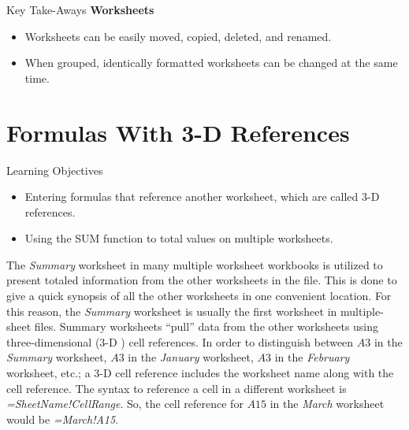 \begin{center}
	\begin{tkwbox}{Key Take-Aways}
		\textbf{Worksheets}
		\\
		\begin{itemize}
			\setlength{\itemsep}{0pt}
			\setlength{\parskip}{0pt}
			\setlength{\parsep}{0pt}
			
			\item Worksheets can be easily moved, copied, deleted, and renamed.
			\item When grouped, identically formatted worksheets can be changed at the same time.
			
		\end{itemize}
	\end{tkwbox}
\end{center}

\section{Formulas With 3-D References}

\begin{center}
	\begin{objbox}{Learning Objectives}
		\begin{itemize}
			\setlength{\itemsep}{0pt}
			\setlength{\parskip}{0pt}
			\setlength{\parsep}{0pt}

			\item Entering formulas that reference another worksheet, which are called $ 3 $-D references.
			\item Using the SUM function to total values on multiple worksheets.
			
		\end{itemize}
	\end{objbox}
\end{center}

The \textit{Summary} worksheet in many multiple worksheet workbooks is utilized to present totaled information from the other worksheets in the file. This is done to give a quick synopsis of all the other worksheets in one convenient location. For this reason, the \textit{Summary} worksheet is usually the first worksheet in multiple-sheet files. Summary worksheets ``pull'' data from the other worksheets using three-dimensional ($ 3 $-D ) cell references. In order to distinguish between $ A3 $ in the \textit{Summary} worksheet, $ A3 $ in the \textit{January} worksheet, $ A3 $ in the \textit{February} worksheet, etc.; a $ 3 $-D cell reference includes the worksheet name along with the cell reference. The syntax to reference a cell in a different worksheet is \textit{=SheetName!CellRange}. So, the cell reference for $ A15 $ in the \textit{March} worksheet would be \textit{=March!A15}.

